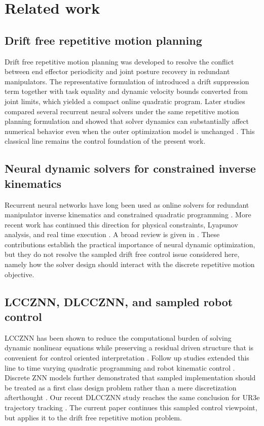 \section{Related work}

\subsection{Drift free repetitive motion planning}

Drift free repetitive motion planning was developed to resolve the conflict between end effector periodicity and joint posture recovery in redundant manipulators. The representative formulation of \citet{zhang2009rmp} introduced a drift suppression term together with task equality and dynamic velocity bounds converted from joint limits, which yielded a compact online quadratic program. Later studies compared several recurrent neural solvers under the same repetitive motion planning formulation and showed that solver dynamics can substantially affect numerical behavior even when the outer optimization model is unchanged \citep{zhang2017three}. This classical line remains the control foundation of the present work.

\subsection{Neural dynamic solvers for constrained inverse kinematics}

Recurrent neural networks have long been used as online solvers for redundant manipulator inverse kinematics and constrained quadratic programming \citep{wang2004recurrent,toshani2014ik}. More recent work has continued this direction for physical constraints, Lyapunov analysis, and real time execution \citep{tan2022physical}. A broad review is given in \citet{hassan2020review}. These contributions establish the practical importance of neural dynamic optimization, but they do not resolve the sampled drift free control issue considered here, namely how the solver design should interact with the discrete repetitive motion objective.

\subsection{LCCZNN, DLCCZNN, and sampled robot control}

LCCZNN has been shown to reduce the computational burden of solving dynamic nonlinear equations while preserving a residual driven structure that is convenient for control oriented interpretation \citep{zheng2024lccznn}. Follow up studies extended this line to time varying quadratic programming and robot kinematic control \citep{yang2025predefined,wen2024firstsecond,yang2026enhanced}. Discrete ZNN models further demonstrated that sampled implementation should be treated as a first class design problem rather than a mere discretization afterthought \citep{qiu2022jerk}. Our recent DLCCZNN study reaches the same conclusion for UR3e trajectory tracking \citep{li2026dlccznn}. The current paper continues this sampled control viewpoint, but applies it to the drift free repetitive motion problem.

